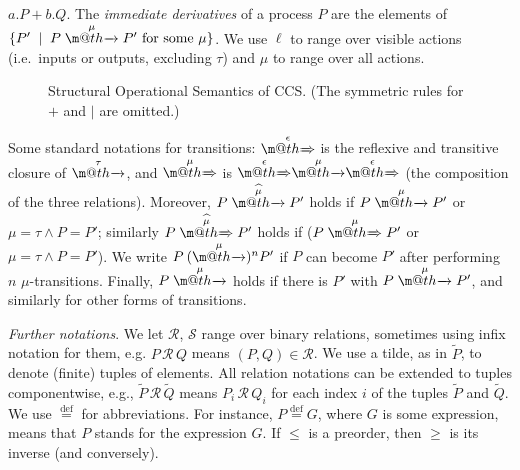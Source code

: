 \documentclass[GCNS]{yincog}
\makeatletter
\def \rightarrowfill{$\m@th\mathord{\smash-}\mkern-6mu%
  \cleaders\hbox{$\mkern-2mu\mathord{\smash-}\mkern-2mu$}\hfill
  \mkern-6mu\mathord\rightarrow$}
\def \rightarrowfillWEAK{$\m@th\mathord{\smash=}\mkern-6mu%
  \cleaders\hbox{$\mkern-2mu\mathord{\smash=}\mkern-2mu$}\hfill
  \mkern-6mu\mathord\Rightarrow$}
\theoremstyle{remark}
\theoremstyle{theorem}
\theoremstyle{remark}
\def\res#1{{\boldsymbol \nu} #1\:}
\newcommand{\outC}[1]{\overline{#1}}
\def\sub#1#2{\{\raisebox{.5ex}{\small$#1$}\! / \!\mbox{\small$#2$}\}}
\newcommand{\arr}[1]{\mathrel{\stackrel{{\;\;#1\;\;}}{\mbox{\rightarrowfill}}}}
\newcommand{\Arr}[1]{\mathrel{\stackrel{{\;\;#1\;\;}}{\mbox{\rightarrowfillWEAK}}}}
\newcommand{\arcap}[1]{\mathrel{\stackrel{{\;\; {\widehat{#1}} \;\;}}{\mbox{\rightarrowfill}}}}
\newcommand{\Arcap}[1]{\mathrel{\stackrel{{\;\;{\widehat{#1}}\;\;}}{\mbox{\rightarrowfillWEAK}}}}
\def\Rvtex{\mathcal{R}}
\def\Svtex{\mathcal{S}}
\def\stvtex{\; \mid \;}
\def\DSdefi{\stackrel{\text{def}}{=}}
\renewcommand{\tilde}{\widetilde}
\newcommand{\recu}[2]{\mathtt{rec}\: #1 . #2}
\newcommand{\hbvtex}{\hspace{0.5cm}}
\newcommand{\til}{\tilde}
\newcommand{\hkvtex}{\hspace{0.2cm}}
\makeatother
\begin{document}
$a.P + b.Q$. The \emph{immediate derivatives} of a process $P$ are the elements
of $\{P' \stvtex P \arr\mu P' \mbox{ for some $\mu $}\}$. We use
$\ell $ to range over visible actions (i.e.~inputs or outputs, excluding
$\tau $) and $\mu $ to range over all actions.
%
\begin{figure*}%
%
%
\caption{Structural Operational Semantics of CCS. (The symmetric rules for $+$
and $|$ are omitted.)}
 \label{f:LTSCCS}
\end{figure*}

Some standard notations for transitions: $\Arr\epsilon $ is the reflexive
and transitive closure of $\arr\tau $, and $\Arr \mu $ is
$\Arr\epsilon \arr\mu \Arr\epsilon $ (the composition of the three relations).
Moreover, $P \arcap \mu P'$ holds if $P \arr\mu P'$ or
$\mu =\tau \wedge P = P'$; similarly $P \Arcap \mu P'$ holds if ($P
\Arr\mu P'$ or $\mu =\tau \wedge P = P'$). We write
$P \:(\arr\mu )^{n} P'$ if $P$ can become $P'$ after performing $n$
$\mu $-transitions. Finally, $P \arr\mu $ holds if there is $P'$ with
$P \arr\mu P'$, and similarly for other forms of transitions.

\bigskip\noindent\textit{Further notations}. We let $\Rvtex $, $\Svtex $ range over binary
relations, sometimes using infix notation for them, e.g.
$P \,\Rvtex \, Q$ means $(P,Q) \in \Rvtex $. We use a tilde, as in
$\til P$, to denote (finite) tuples of elements. All relation notations
can be extended to tuples componentwise, e.g.,
$\til P \,\Rvtex \, \til Q$ means $P_i \,\Rvtex \, Q_i$ for each index
$i$ of the tuples $\til P$ and $\til Q$. We use $\DSdefi $ for abbreviations.
For instance, $P \DSdefi G $, where $G$ is some expression, means that
$P$ stands for the expression $G$. If $\leq $ is a preorder, then
$\geq $ is its inverse (and conversely).
\end{document}
